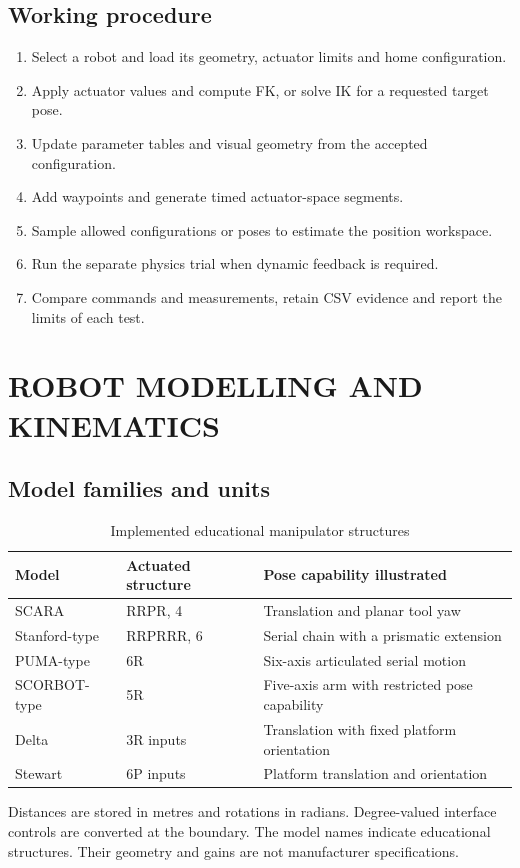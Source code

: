 \documentclass[11pt,a4paper,oneside]{report}
\begin{document}
\section{Working procedure}
\begin{enumerate}
\item Select a robot and load its geometry, actuator limits and home configuration.
\item Apply actuator values and compute FK, or solve IK for a requested target pose.
\item Update parameter tables and visual geometry from the accepted configuration.
\item Add waypoints and generate timed actuator-space segments.
\item Sample allowed configurations or poses to estimate the position workspace.
\item Run the separate physics trial when dynamic feedback is required.
\item Compare commands and measurements, retain CSV evidence and report the limits of each test.
\end{enumerate}


\chapter{ROBOT MODELLING AND KINEMATICS}
\section{Model families and units}
\begin{table}[H]\centering
\caption{Implemented educational manipulator structures}
\begin{tabularx}{\textwidth}{l l X}\toprule
Model&Actuated structure&Pose capability illustrated\\\midrule
SCARA&RRPR, 4&Translation and planar tool yaw\\
Stanford-type&RRPRRR, 6&Serial chain with a prismatic extension\\
PUMA-type&6R&Six-axis articulated serial motion\\
SCORBOT-type&5R&Five-axis arm with restricted pose capability\\
Delta&3R inputs&Translation with fixed platform orientation\\
Stewart&6P inputs&Platform translation and orientation\\\bottomrule
\end{tabularx}
\end{table}
Distances are stored in metres and rotations in radians. Degree-valued interface controls are converted at the boundary. The model names indicate educational structures. Their geometry and gains are not manufacturer specifications.
\end{document}

